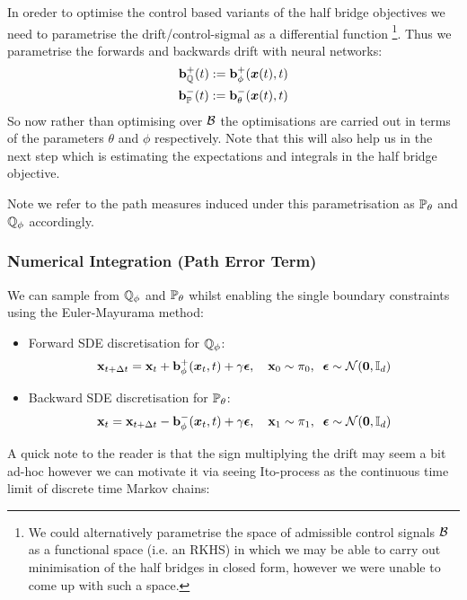 \documentclass[a4paper,12pt,twoside,openright]{report}
\theoremstyle{definition}
\begin{document}
In oreder to optimise the control based variants of the half bridge objectives we need to parametrise the drift/control-sigmal as a differential function \footnote{We could alternatively parametrise the space of admissible control signals $\calB$ as a functional space (i.e. an  RKHS) in which we may be able to carry out minimisation of the half bridges in closed form, however we were unable to come up with such a space.}. Thus we parametrise the forwards and backwards drift with neural networks:
\begin{align}
    \rvb^{+}_{\Q}(t) := \rvb^{+}_{\phi}(\vx(t), t) \nonumber \\
    \rvb^{-}_{\P}(t) := \rvb^{-}_{\theta}(\vx(t), t)
\end{align}
So now rather than optimising over $\calB$ the optimisations are carried out in terms of the parameters $\theta$ and $\phi$ respectively. Note that this will also help us in the next step which is estimating the expectations and integrals in the half bridge objective.

Note we refer to the path measures induced under this parametrisation as $\P_{\theta}$ and $\Q_{\phi}$ accordingly.

\subsubsection{Numerical Integration (Path Error Term)}
We can sample from $\Q_{\phi}$ and $\P_{\theta}$ whilst enabling the single boundary constraints using the Euler-Mayurama method:
\begin{itemize}
    \item  Forward SDE discretisation for $\Q_{\phi}$:
\begin{align*}
    \rvx_{t + \Delta t} = \rvx_t + \rvb^{+}_{\phi}(\vx_t, t) + \gamma \rvepsilon, \quad \rvx_0 \sim \pi_0, \;\;\rvepsilon \sim \calN(\vzero, \I) 
\end{align*}
    \item  Backward SDE discretisation for $\P_{\theta}$:
\begin{align*}
    \rvx_{t} = \rvx_{t+\Delta t} - \rvb^{-}_{\phi}(\vx_t, t) + \gamma \rvepsilon, \quad \rvx_1 \sim \pi_1,\;\; \rvepsilon \sim \calN(\vzero, \I)
\end{align*}
\end{itemize}
A quick note to the reader is that the sign multiplying the drift may seem a bit ad-hoc however we can motivate it via seeing Ito-process as the continuous time limit of discrete time Markov chains:
\end{document}
